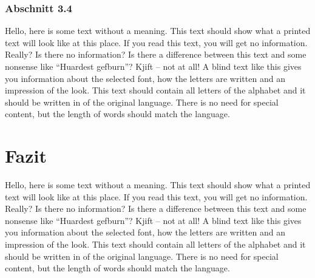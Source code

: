 \subsubsection{Abschnitt 3.4}\label{Abschnitt34}
Hello, here is some text without a meaning. This text should show what a printed text will look like at this place. If you read this text, you will get no information. Really? Is there no information? Is there a difference between this text and some nonsense like “Huardest gefburn”? Kjift – not at all! A blind text like this gives you information about the selected font, how the letters are written and an impression of the look. This text should contain all letters of the alphabet and it should be written in of the original language. There is no need for special content, but the length of words should match the language.

\newpage

\section{Fazit}\label{Fazit}
Hello, here is some text without a meaning. This text should show what a printed text will look like at this place. If you read this text, you will get no information. Really? Is there no information? Is there a difference between this text and some nonsense like “Huardest gefburn”? Kjift – not at all! A blind text like this gives you information about the selected font, how the letters are written and an impression of the look. This text should contain all letters of the alphabet and it should be written in of the original language. There is no need for special content, but the length of words should match the language.




